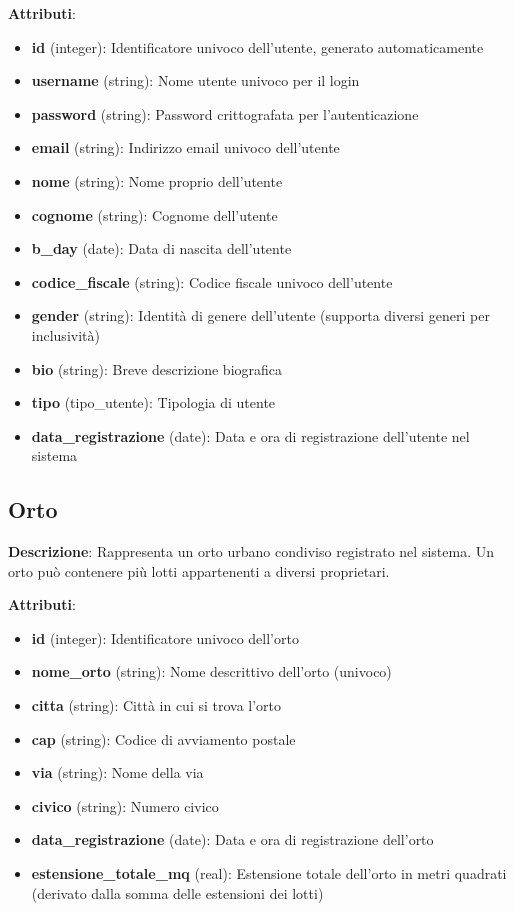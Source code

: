 \documentclass[12pt,a4paper]{article}
\begin{document}
\textbf{Attributi}:
\begin{itemize}[leftmargin=2.5cm]
    \item \textbf{id} (integer): Identificatore univoco dell'utente, generato automaticamente
    \item \textbf{username} (string): Nome utente univoco per il login
    \item \textbf{password} (string): Password crittografata per l'autenticazione
    \item \textbf{email} (string): Indirizzo email univoco dell'utente
    \item \textbf{nome} (string): Nome proprio dell'utente
    \item \textbf{cognome} (string): Cognome dell'utente
    \item \textbf{b\_day} (date): Data di nascita dell'utente
    \item \textbf{codice\_fiscale} (string): Codice fiscale univoco dell'utente
    \item \textbf{gender} (string): Identità di genere dell'utente (supporta diversi generi per inclusività)
    \item \textbf{bio} (string): Breve descrizione biografica
    \item \textbf{tipo} (tipo\_utente): Tipologia di utente
    \item \textbf{data\_registrazione} (date): Data e ora di registrazione dell'utente nel sistema
\end{itemize}

\subsection{Orto}

\textbf{Descrizione}: Rappresenta un orto urbano condiviso registrato nel sistema. Un orto può contenere più lotti appartenenti a diversi proprietari.

\textbf{Attributi}:
\begin{itemize}[leftmargin=2.5cm]
    \item \textbf{id} (integer): Identificatore univoco dell'orto
    \item \textbf{nome\_orto} (string): Nome descrittivo dell'orto (univoco)
    \item \textbf{citta} (string): Città in cui si trova l'orto
    \item \textbf{cap} (string): Codice di avviamento postale
    \item \textbf{via} (string): Nome della via
    \item \textbf{civico} (string): Numero civico
    \item \textbf{data\_registrazione} (date): Data e ora di registrazione dell'orto
    \item \textbf{estensione\_totale\_mq} (real): Estensione totale dell'orto in metri quadrati (derivato dalla somma delle estensioni dei lotti)
\end{itemize}
\end{document}
